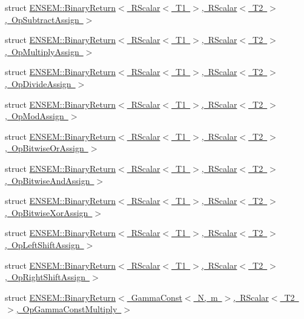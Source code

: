 \begin{DoxyCompactItemize}
\item 
struct \mbox{\hyperlink{structENSEM_1_1BinaryReturn_3_01RScalar_3_01T1_01_4_00_01RScalar_3_01T2_01_4_00_01OpSubtractAssign_01_4}{E\+N\+S\+E\+M\+::\+Binary\+Return$<$ R\+Scalar$<$ T1 $>$, R\+Scalar$<$ T2 $>$, Op\+Subtract\+Assign $>$}}
\item 
struct \mbox{\hyperlink{structENSEM_1_1BinaryReturn_3_01RScalar_3_01T1_01_4_00_01RScalar_3_01T2_01_4_00_01OpMultiplyAssign_01_4}{E\+N\+S\+E\+M\+::\+Binary\+Return$<$ R\+Scalar$<$ T1 $>$, R\+Scalar$<$ T2 $>$, Op\+Multiply\+Assign $>$}}
\item 
struct \mbox{\hyperlink{structENSEM_1_1BinaryReturn_3_01RScalar_3_01T1_01_4_00_01RScalar_3_01T2_01_4_00_01OpDivideAssign_01_4}{E\+N\+S\+E\+M\+::\+Binary\+Return$<$ R\+Scalar$<$ T1 $>$, R\+Scalar$<$ T2 $>$, Op\+Divide\+Assign $>$}}
\item 
struct \mbox{\hyperlink{structENSEM_1_1BinaryReturn_3_01RScalar_3_01T1_01_4_00_01RScalar_3_01T2_01_4_00_01OpModAssign_01_4}{E\+N\+S\+E\+M\+::\+Binary\+Return$<$ R\+Scalar$<$ T1 $>$, R\+Scalar$<$ T2 $>$, Op\+Mod\+Assign $>$}}
\item 
struct \mbox{\hyperlink{structENSEM_1_1BinaryReturn_3_01RScalar_3_01T1_01_4_00_01RScalar_3_01T2_01_4_00_01OpBitwiseOrAssign_01_4}{E\+N\+S\+E\+M\+::\+Binary\+Return$<$ R\+Scalar$<$ T1 $>$, R\+Scalar$<$ T2 $>$, Op\+Bitwise\+Or\+Assign $>$}}
\item 
struct \mbox{\hyperlink{structENSEM_1_1BinaryReturn_3_01RScalar_3_01T1_01_4_00_01RScalar_3_01T2_01_4_00_01OpBitwiseAndAssign_01_4}{E\+N\+S\+E\+M\+::\+Binary\+Return$<$ R\+Scalar$<$ T1 $>$, R\+Scalar$<$ T2 $>$, Op\+Bitwise\+And\+Assign $>$}}
\item 
struct \mbox{\hyperlink{structENSEM_1_1BinaryReturn_3_01RScalar_3_01T1_01_4_00_01RScalar_3_01T2_01_4_00_01OpBitwiseXorAssign_01_4}{E\+N\+S\+E\+M\+::\+Binary\+Return$<$ R\+Scalar$<$ T1 $>$, R\+Scalar$<$ T2 $>$, Op\+Bitwise\+Xor\+Assign $>$}}
\item 
struct \mbox{\hyperlink{structENSEM_1_1BinaryReturn_3_01RScalar_3_01T1_01_4_00_01RScalar_3_01T2_01_4_00_01OpLeftShiftAssign_01_4}{E\+N\+S\+E\+M\+::\+Binary\+Return$<$ R\+Scalar$<$ T1 $>$, R\+Scalar$<$ T2 $>$, Op\+Left\+Shift\+Assign $>$}}
\item 
struct \mbox{\hyperlink{structENSEM_1_1BinaryReturn_3_01RScalar_3_01T1_01_4_00_01RScalar_3_01T2_01_4_00_01OpRightShiftAssign_01_4}{E\+N\+S\+E\+M\+::\+Binary\+Return$<$ R\+Scalar$<$ T1 $>$, R\+Scalar$<$ T2 $>$, Op\+Right\+Shift\+Assign $>$}}
\item 
struct \mbox{\hyperlink{structENSEM_1_1BinaryReturn_3_01GammaConst_3_01N_00_01m_01_4_00_01RScalar_3_01T2_01_4_00_01OpGammaConstMultiply_01_4}{E\+N\+S\+E\+M\+::\+Binary\+Return$<$ Gamma\+Const$<$ N, m $>$, R\+Scalar$<$ T2 $>$, Op\+Gamma\+Const\+Multiply $>$}}

\end{DoxyCompactItemize}
